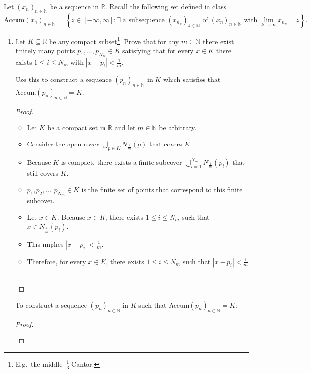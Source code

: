 \documentclass[10pt]{article}
\newcommand{\N}{\mathbb{N}}
\newcommand{\R}{\mathbb{R}}
\newenvironment{problem}[2][Problem]{\begin{trivlist}
\item[\hskip \labelsep {\bfseries #1}\hskip \labelsep {\bfseries #2.}]}{\end{trivlist}}
\begin{document}
\newpage
\begin{problem}{3}
	Let $ (x_n)_{n\in \N} $ be a sequence in $ \R $. Recall the following set defined in class
	\[ \mathrm{Accum}(x_n)_{n\in \N} = \left\{ z \in [-\infty,\infty] : \exists \text{ a subsequence } (x_{n_k})_{k\in \N} \text{ of } (x_n)_{n\in \N} \text{ with } \lim_{k \to \infty} x_{n_k}=z \right\}. \]
	\begin{enumerate}%
		\item Let $ K \subseteq \R $ be any compact subset\footnote{E.g.~the middle--$ \frac{1}{3} $ Cantor.}. Prove that for any $ m \in \N $ there exist finitely many points $ p_1,...,p_{N_m} \in K $ satisfying that for every $ x \in K $ there exists $ 1 \leq i \leq N_m $ with $ |x-p_i|<\frac{1}{m} $. 
		
		Use this to construct a sequence $ (p_n)_{n\in \N} $ in $ K $ which satisfies that $ \mathrm{Accum}(p_n)_{n\in \N} = K $.
            \begin{proof}
                \hfill
                \begin{itemize}
                    \item Let $K$ be a compact set in $\R$ and let $m \in \N$ be arbitrary.
                    \item Consider the open cover $\bigcup_{p \in K} N_{\frac{1}{m}}(p)$ that covers $K$.
                    \item Because $K$ is compact, there exists a finite subcover $\bigcup_{i=1}^{N_m} N_{\frac{1}{m}}(p_i)$ that still covers $K$.
                    \item $p_1, p_2, \ldots, p_{N_m} \in K$ is the finite set of points that correspond to this finite subcover.
                    \item Let $x \in K$. Because $x \in K$, there exists $1 \leq i \leq N_m$ such that $x \in N_{\frac{1}{m}}(p_i)$.
                    \item This implies $|x - p_i| < \frac{1}{m}$.
                    \item Therefore, for every $x \in K$, there exists $1 \leq i \leq N_m$ such that $|x - p_i| < \frac{1}{m}$.
                \end{itemize}
            \end{proof}
            To construct a sequence $(p_n)_{n\in \N}$ in $K$ such that $\mathrm{Accum}(p_n)_{n\in \N} = K$:
            \begin{proof}
                \hfill
                \begin{itemize}

\end{itemize}
\end{proof}
\end{enumerate}
\end{problem}
\end{document}
